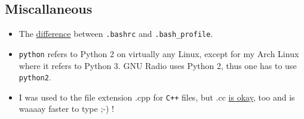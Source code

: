 \documentclass{article}
\begin{document}
\subsection{Miscallaneous}

\begin{itemize}
	\item The \href{http://www.joshstaiger.org/archives/2005/07/bash_profile_vs.html }{difference} between \verb|.bashrc| and \verb|.bash_profile|.
	
	\item \verb|python| refers to Python 2 on virtually any Linux, except for my Arch Linux where it refers to Python 3. GNU Radio uses Python 2, thus one has to use \verb|python2|. 
	
	\item I was used to the file extension .cpp for \texttt{C++} files, but .cc \href{http://stackoverflow.com/questions/1545080/c-code-file-extension-cc-vs-cpp}{is okay}, too and is waaaay faster to type ;-) !
\end{itemize}
\end{document}
